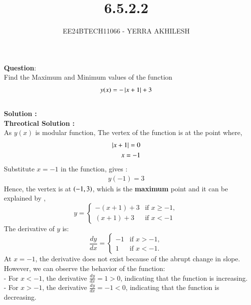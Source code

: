 \documentclass[journal]{IEEEtran}
\begin{document}

\vspace{3cm}

\title{6.5.2.2}
\author{EE24BTECH11066 - YERRA AKHILESH}
{\let\newpage\relax\maketitle}

\renewcommand{\thefigure}{\theenumi}
\renewcommand{\thetable}{\theenumi}
\setlength{\intextsep}{10pt} %

\renewcommand{\thetable}{\theenumi}
\textbf{Question}:\\
Find the Maximum and Minimum values of the function \\
$$y(x) = - \left\vert x + 1\right\vert +3$$\\
\textbf{Solution : }\\
\textbf{Threotical Solution :}\\

As $y(x)$ is modular function, The vertex of the function is at the point where,
\begin{align}
    \left\vert x + 1\right\vert = 0\\
    x = -1
\end{align}
Substitute $x = -1$ in the function, gives :
\begin{align}
    y(-1) = 3
\end{align}
Hence, the vertex is at $\left(-1,3\right)$, which is the \textbf{maximum} point and it can be explained by ,
$$y =
\begin{cases} 
-(x+1) + 3 & \text{if } x \geq -1, \\ 
(x+1) + 3 & \text{if } x < -1
\end{cases}
$$
The derivative of $y$ is:
$$
\frac{dy}{dx} =
\begin{cases} 
-1 & \text{if } x > -1, \\ 
1 & \text{if } x < -1.
\end{cases}
$$
At $x = -1$, the derivative does not exist because of the abrupt change in slope. However, we can observe the behavior of the function:\\
- For \( x < -1 \), the derivative \( \frac{dy}{dx} = 1 > 0 \), indicating that the function is increasing.\\
- For \( x > -1 \), the derivative \( \frac{dy}{dx} = -1 < 0 \), indicating that the function is decreasing.\\
\end{document}
